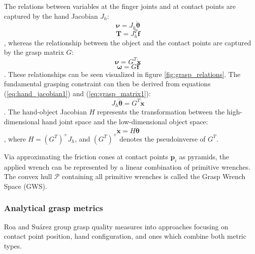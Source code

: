 The relations between variables at the finger joints and at contact points are captured by the hand Jacobian
$ J_h $:
\begin{equation} \label{eq:hand_jacobian1}
    \boldsymbol{\nu} = J_h \boldsymbol{\dot{\theta}}
\end{equation}
\begin{equation} \label{eq:hand_jacobian2}
    \boldsymbol{T} = J_h^T \boldsymbol{f}
\end{equation}
, whereas the relationship between the object and the contact points are captured by the grasp matrix $ G $:
\begin{equation} \label{eq:grasp_matrix1}
    \boldsymbol{\nu} = G^T \boldsymbol{\dot{x}}
\end{equation}
\begin{equation} \label{eq:grasp_matrix2}
    \boldsymbol{\omega} = G \boldsymbol{f}
\end{equation}
. These relationships can be seen visualized in figure \ref{fig:grasp_relations}. The fundamental grasping constraint
can then be derived from equations (\ref{eq:hand_jacobian1}) and (\ref{eq:grasp_matrix1}):
\begin{equation} \label{eq:grasp_constraint}
    J_h \boldsymbol{\dot{\theta}} = G^T \boldsymbol{\dot{x}}
\end{equation}
. The hand-object Jacobian $ H $ represents the transformation between the high-dimensional hand joint space and the
low-dimensional object space:
\begin{equation} \label{eq:hand_object_jacobian}
    \boldsymbol{\dot{x}} = H \boldsymbol{\dot{\theta}}
\end{equation}
, where $ H = (G^T)^+ J_h $, and $ (G^T)^+ $ denotes the pseudoinverse of $ G^T $.

Via approximating the friction cones at contact points $ \boldsymbol{p}_i $ as pyramids, the applied wrench can be
represented by a linear combination of primitive wrenches. The convex hull $ \mathcal{P} $ containing all primitive
wrenches is called the Grasp Wrench Space (GWS).

\subsubsection*{Analytical grasp metrics}

Roa and Su{\'a}rez \cite{Roa2015} group grasp quality measures into approaches focusing on contact point position, hand
configuration, and ones which combine both metric types.

